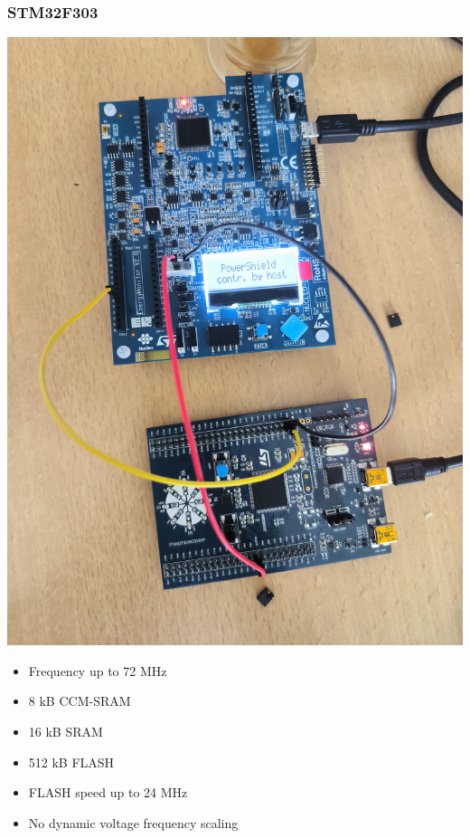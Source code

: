 \documentclass[
	11pt, %
]{beamer}
\begin{document}
\begin{frame}
    \frametitle{STM32F303}
		\centering
		\begin{minipage}{0.4\textwidth}
            \includegraphics[scale = 0.04]{images/stm32f.jpg}
        \end{minipage}
        \begin{minipage}{0.5\textwidth}
			\centering
            \begin{itemize}
                \item Frequency up to 72 MHz 
                \item 8 kB CCM-SRAM 
                \item 16 kB SRAM
                \item 512 kB FLASH
                \item FLASH speed up to 24 MHz
                \item No dynamic voltage frequency scaling
            \end{itemize}

		\end{minipage}
\end{frame}
\end{document}

